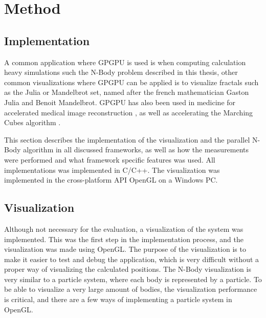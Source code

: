 
\chapter{Method}

\section{Implementation}
A common application where GPGPU is used is when computing calculation heavy simulations such the N-Body problem described in this thesis, other common visualizations where GPGPU can be applied is to visualize fractals such as the Julia or Mandelbrot set, named after the french mathematician Gaston Julia and Benoit Mandelbrot. GPGPU has also been used in medicine for accelerated medical image reconstruction \cite{archirapatkave2011gpgpu}, as well as accelerating the Marching Cubes algorithm \cite{johansson2006accelerating}. 

This section describes the implementation of the visualization and the parallel N-Body algorithm in all discussed frameworks, as well as how the measurements were performed and what framework specific features was used. All implementations was implemented in C/C++. The visualization was implemented in the cross-platform API OpenGL on a Windows PC.

\section{Visualization}

Although not necessary for the evaluation, a visualization of the system was implemented. This was the first step in the implementation process, and the visualization was made using OpenGL. The purpose of the visualization is to make it easier to test and debug the application, which is very difficult without a proper way of visualizing the calculated positions. The N-Body visualization is very similar to a particle system, where each body is represented by a particle. To be able to visualize a very large amount of bodies, the visualization performance is critical, and there are a few ways of implementing a particle system in OpenGL.

